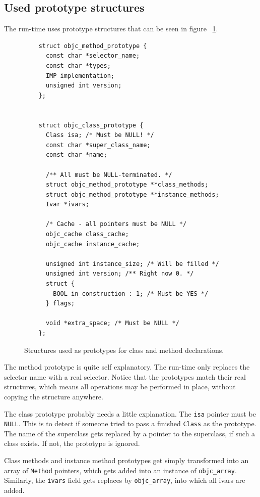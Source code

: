 \subsection{Used prototype structures}

The run-time uses prototype structures that can be seen in figure ~\ref{fig:objc_prototypes}.

\begin{figure}[H]
  \begin{verbatim}
    struct objc_method_prototype {
      const char *selector_name;
      const char *types;
      IMP implementation;
      unsigned int version;
    };
    
    
    struct objc_class_prototype {
      Class isa; /* Must be NULL! */
      const char *super_class_name;
      const char *name;
	
      /** All must be NULL-terminated. */
      struct objc_method_prototype **class_methods;
      struct objc_method_prototype **instance_methods;
      Ivar *ivars;
	
      /* Cache - all pointers must be NULL */
      objc_cache class_cache;
      objc_cache instance_cache;
	
      unsigned int instance_size; /* Will be filled */
      unsigned int version; /** Right now 0. */
      struct {
        BOOL in_construction : 1; /* Must be YES */
      } flags;
      
      void *extra_space; /* Must be NULL */
    };
  \end{verbatim}
  \centering{}
  \caption{Structures used as prototypes for class and method declarations.}
  \label{fig:objc_prototypes}
\end{figure}

The method prototype is quite self explanatory. The run-time only replaces the selector name with a real selector. Notice that the prototypes match their real structures, which means all operations may be performed in place, without copying the structure anywhere.

The class prototype probably needs a little explanation. The \verb=isa= pointer must be \verb=NULL=. This is to detect if someone tried to pass a finished \verb=Class= as the prototype. The name of the superclass gets replaced by a pointer to the superclass, if such a class exists. If not, the prototype is ignored.

Class methods and instance method prototypes get simply transformed into an array of \verb=Method= pointers, which gets added into an instance of \verb=objc_array=. Similarly, the \verb=ivars= field gets replaces by \verb=objc_array=, into which all ivars are added.

